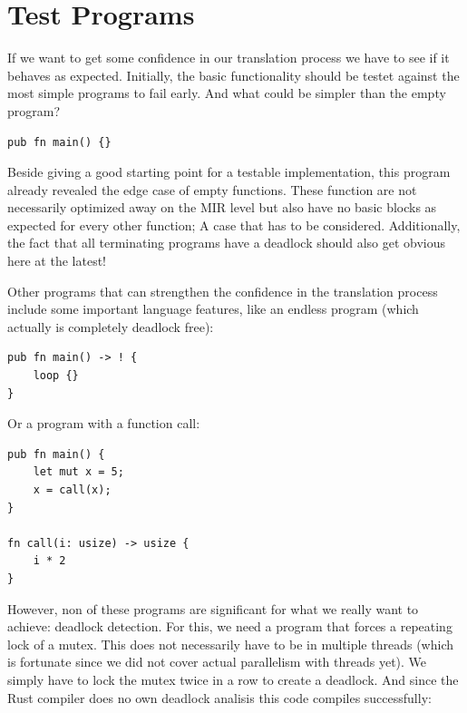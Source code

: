 \section{Test Programs}
\label{app_test}
If we want to get some confidence in our translation process we have to see if it behaves as expected.
Initially, the basic functionality should be testet against the most simple programs to fail early.
And what could be simpler than the empty program?
\begin{lstlisting}
pub fn main() {}
\end{lstlisting}
Beside giving a good starting point for a testable implementation, this program already revealed the edge case of empty functions.
These function are not necessarily optimized away on the MIR level but also have no basic blocks as expected for every other function;
A case that has to be considered.
Additionally, the fact that all terminating programs have a deadlock should also get obvious here at the latest!

Other programs that can strengthen the confidence in the translation process include some important language features, like an endless program (which actually is completely deadlock free):

\begin{lstlisting}
pub fn main() -> ! {
    loop {}
}
\end{lstlisting}
Or a program with a function call:

\begin{lstlisting}
pub fn main() {
    let mut x = 5;
    x = call(x);
}

fn call(i: usize) -> usize {
    i * 2
}
\end{lstlisting}

However, non of these programs are significant for what we really want to achieve: deadlock detection.
For this, we need a program that forces a repeating lock of a mutex.
This does not necessarily have to be in multiple threads
(which is fortunate since we did not cover actual parallelism with threads yet).
We simply have to lock the mutex twice in a row to create a deadlock.
And since the Rust compiler does no own deadlock analisis this code compiles successfully:

